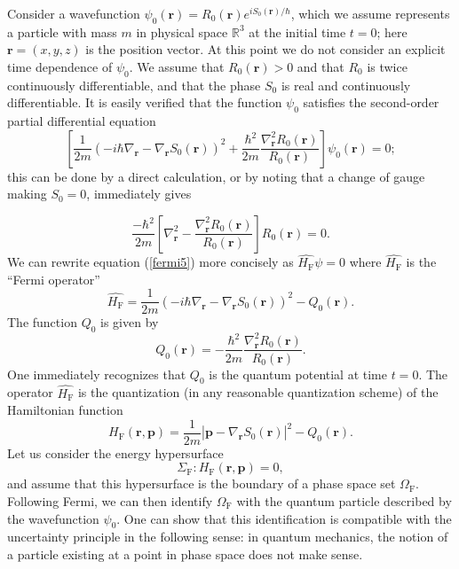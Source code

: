 \documentclass[11pt]{article}%
\begin{document}
Consider a wavefunction $\psi_{0}(\mathbf{r})=R_{0}(\mathbf{r})e^{iS_{0}%
(\mathbf{r})/\hbar}$, which we assume represents a particle with mass $m$ in
physical space $\mathbb{R}^{3}$ at the initial time $t=0$; here $\mathbf{r}%
=(x,y,z)$ is the position vector. At this point we do not consider an explicit
time dependence of $\psi_{0}$. We assume that $R_{0}(\mathbf{r})>0$ and that
$R_{0}$ is twice continuously differentiable, and that the phase $S_{0}$ is
real and continuously differentiable. It is easily verified that the function
$\psi_{0}$ satisfies the second-order partial differential equation%
\begin{equation}
\left[  \frac{1}{2m}\left(  -i\hbar\nabla_{\mathbf{r}}-\nabla_{\mathbf{r}%
}S_{0}(\mathbf{r})\right)  ^{2}+\frac{\hbar^{2}}{2m}\frac{\nabla_{\mathbf{r}%
}^{2}R_{0}(\mathbf{r})}{R_{0}(\mathbf{r})}\right]  \psi_{0}(\mathbf{r})=0;
\label{fermi5}%
\end{equation}
this can be done by a direct calculation, or by noting that a change of gauge
making $S_{0}=0$, immediately gives%

\[
\frac{-\hbar^{2}}{2m}\left[  \nabla_{\mathbf{r}}^{2}-\frac{\nabla_{\mathbf{r}%
}^{2}R_{0}(\mathbf{r})}{R_{0}(\mathbf{r})}\right]  R_{0}(\mathbf{r})=0.
\]
We can rewrite equation (\ref{fermi5}) more concisely as
$\widehat{H_{\mathrm{F}}}\psi=0$ where $\widehat{H_{\mathrm{F}}}$ is the
\textquotedblleft Fermi operator\textquotedblright\
\begin{equation}
\widehat{H_{\mathrm{F}}}=\frac{1}{2m}\left(  -i\hbar\nabla_{\mathbf{r}}%
-\nabla_{\mathbf{r}}S_{0}(\mathbf{r})\right)  ^{2}-Q_{0}(\mathbf{r}).
\label{hf}%
\end{equation}
The function $Q_{0}$ is given by%
\begin{equation}
Q_{0}(\mathbf{r})=-\frac{\hbar^{2}}{2m}\frac{\nabla_{\mathbf{r}}^{2}%
R_{0}(\mathbf{r})}{R_{0}(\mathbf{r})}. \label{qpfermi1}%
\end{equation}
One immediately recognizes that $Q_{0}$ is the quantum potential at time
$t=0$. The operator $\widehat{H_{\mathrm{F}}}$ is the quantization (in any
reasonable quantization scheme) of the Hamiltonian function%
\begin{equation}
H_{\mathrm{F}}(\mathbf{r},\mathbf{p})=\frac{1}{2m}|\mathbf{p}-\nabla
_{\mathbf{r}}S_{0}(\mathbf{r})|^{2}-Q_{0}(\mathbf{r}). \label{hfcl}%
\end{equation}
Let us consider the energy hypersurface%
\begin{equation}
\Sigma_{\mathrm{F}}:H_{\mathrm{F}}(\mathbf{r},\mathbf{p})=0, \label{1}%
\end{equation}
and assume that this hypersurface is the boundary of a phase space set
$\Omega_{\mathrm{F}}$. Following Fermi, we can then identify $\Omega
_{\mathrm{F}}$ with the quantum particle described by the wavefunction
$\psi_{0}$. One can show that this identification is compatible with the
uncertainty principle in the following sense: in quantum mechanics, the notion
of a particle existing at a point in phase space does not make sense.
\end{document}
